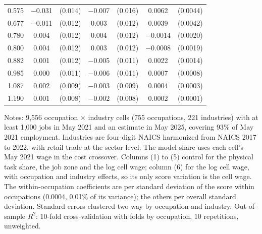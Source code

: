 \begin{table}[tbp]
\begin{tabular}{@{}lcccccc@{}}
0.575 & $-$0.031 & (0.014) & $-$0.007 & (0.016) & 0.0062 & (0.0044)\\
0.677 & $-$0.011 & (0.012) & 0.003 & (0.012) & 0.0039 & (0.0042)\\
0.780 & 0.004 & (0.012) & 0.004 & (0.012) & $-$0.0014 & (0.0020)\\
0.800 & 0.004 & (0.012) & 0.003 & (0.012) & $-$0.0008 & (0.0019)\\
0.882 & 0.001 & (0.012) & $-$0.005 & (0.011) & 0.0022 & (0.0014)\\
0.985 & 0.000 & (0.011) & $-$0.006 & (0.011) & 0.0007 & (0.0008)\\
1.087 & 0.002 & (0.009) & $-$0.003 & (0.009) & 0.0004 & (0.0003)\\
1.190 & 0.001 & (0.008) & $-$0.002 & (0.008) & 0.0002 & (0.0001)\\
\bottomrule
\end{tabular}
\smallskip
\begin{minipage}{0.97\linewidth}\footnotesize
Notes: 9,556 occupation $\times$ industry cells (755 occupations, 221 industries) with at least 1,000 jobs in May 2021 and an estimate in May 2025, covering 93\% of May 2021 employment. Industries are four-digit NAICS harmonized from NAICS 2017 to 2022, with retail trade at the sector level. The model share uses each cell's May 2021 wage in the cost crossover. Columns (1) to (5) control for the physical task share, the job zone and the log cell wage; column (6) for the log cell wage, with occupation and industry effects, so its only score variation is the cell wage. The within-occupation coefficients are per standard deviation of the score within occupations (0.0004, 0.01\% of its variance); the others per overall standard deviation. Standard errors clustered two-way by occupation and industry. Out-of-sample $R^2$: 10-fold cross-validation with folds by occupation, 10 repetitions, unweighted.
\end{minipage}
\end{table}
